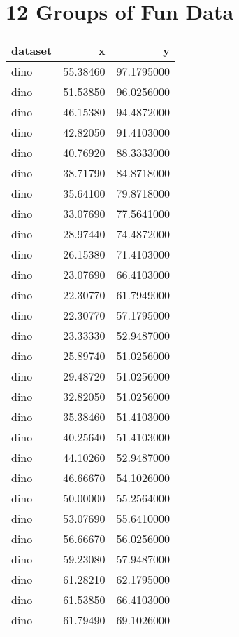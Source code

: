 \documentclass[
]{book}
\theoremstyle{definition}
\theoremstyle{definition}
\theoremstyle{definition}
\theoremstyle{definition}
\theoremstyle{remark}
\begin{document}
\hypertarget{groups-of-fun-data}{%
\chapter{12 Groups of Fun Data}\label{groups-of-fun-data}}

\begin{tabular}{l|r|r}
\hline
dataset & x & y\\
\hline
dino & 55.38460 & 97.1795000\\
\hline
dino & 51.53850 & 96.0256000\\
\hline
dino & 46.15380 & 94.4872000\\
\hline
dino & 42.82050 & 91.4103000\\
\hline
dino & 40.76920 & 88.3333000\\
\hline
dino & 38.71790 & 84.8718000\\
\hline
dino & 35.64100 & 79.8718000\\
\hline
dino & 33.07690 & 77.5641000\\
\hline
dino & 28.97440 & 74.4872000\\
\hline
dino & 26.15380 & 71.4103000\\
\hline
dino & 23.07690 & 66.4103000\\
\hline
dino & 22.30770 & 61.7949000\\
\hline
dino & 22.30770 & 57.1795000\\
\hline
dino & 23.33330 & 52.9487000\\
\hline
dino & 25.89740 & 51.0256000\\
\hline
dino & 29.48720 & 51.0256000\\
\hline
dino & 32.82050 & 51.0256000\\
\hline
dino & 35.38460 & 51.4103000\\
\hline
dino & 40.25640 & 51.4103000\\
\hline
dino & 44.10260 & 52.9487000\\
\hline
dino & 46.66670 & 54.1026000\\
\hline
dino & 50.00000 & 55.2564000\\
\hline
dino & 53.07690 & 55.6410000\\
\hline
dino & 56.66670 & 56.0256000\\
\hline
dino & 59.23080 & 57.9487000\\
\hline
dino & 61.28210 & 62.1795000\\
\hline
dino & 61.53850 & 66.4103000\\
\hline
dino & 61.79490 & 69.1026000\\

\end{tabular}
\end{document}
